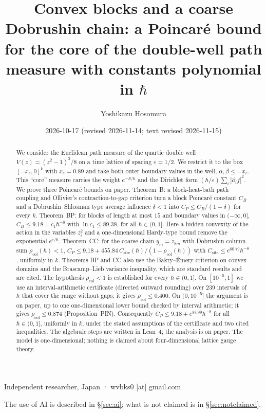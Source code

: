\documentclass[11pt,a4paper]{article}
\title{Convex blocks and a coarse Dobrushin chain: a Poincar\'e bound for the core of the double-well path measure with constants polynomial in $\hbar$}
\author{Yoshikazu Hosomura}
\date{2026-10-17 (revised 2026-11-14; text revised 2026-11-15)}
\theoremstyle{definition}
\theoremstyle{remark}
\newcommand{\xc}{x_c}
\newcommand{\rcol}{\rho_{\mathrm{col}}}
\newcommand{\Csite}{C_{\mathrm{site}}}
\begin{document}
\maketitle
\begin{center}\small Independent researcher, Japan · wvbks0 [at] gmail.com\end{center}
\begin{center}\small The use of AI is described in \S\ref{sec:ai}; what is not claimed is in \S\ref{sec:notclaimed}.\end{center}

\begin{abstract}
We consider the Euclidean path measure of the quartic double well $V(z)=(z^2-1)^2/8$ on a time lattice of spacing $\varepsilon=1/2$. We restrict it to the box $[-\xc,0]^k$ with $\xc=0.89$ and take both outer boundary values in the well, $\alpha,\beta\le-\xc$. This ``core'' measure carries the weight $e^{-S/\hbar}$ and the Dirichlet form $(\hbar/\varepsilon)\sum_i|\partial_if|^2$. We prove three Poincar\'e bounds on paper. Theorem~B: a block-heat-bath path coupling and Ollivier's contraction-to-gap criterion turn a block Poincar\'e constant $C_B$ and a Dobrushin--Shlosman type average influence $\delta<1$ into $C_P\le C_B/(1-\delta)$ for every $k$. Theorem~BP: for blocks of length at most $15$ and boundary values in $(-\infty,0]$, $C_B\le 9.18+c_1\hbar^{-8}$ with $\ln c_1\le 89.38$, for all $\hbar\in(0,1]$. Here a hidden convexity of the action in the variables $z_i^2$ and a one-dimensional Hardy-type bound remove the exponential $e^{c/\hbar}$. Theorem~CC: for the coarse chain $y_m=z_{8m}$ with Dobrushin column sum $\rcol(\hbar)<1$, $C_P\le 9.18+455.84\,\Csite(\hbar)/(1-\rcol(\hbar))$ with $\Csite\le e^{80.79}\hbar^{-8}$, uniformly in $k$. Theorems BP and CC also use the Bakry--\'Emery criterion on convex domains and the Brascamp--Lieb variance inequality, which are standard results and are cited. The hypothesis $\rcol<1$ is established for every $\hbar\in(0,1]$. On $[10^{-5},1]$ we use an interval-arithmetic certificate (directed outward rounding) over $239$ intervals of $\hbar$ that cover the range without gaps; it gives $\rcol\le0.400$. On $(0,10^{-5}]$ the argument is on paper, up to one one-dimensional lower bound checked by interval arithmetic; it gives $\rcol\le0.874$ (Proposition~PIN). Consequently $C_P\le9.18+e^{88.99}\hbar^{-8}$ for all $\hbar\in(0,1]$, uniformly in $k$, under the stated assumptions of the certificate and two cited inequalities. The algebraic steps are written in Lean~4; the analysis is on paper. The model is one-dimensional; nothing is claimed about four-dimensional lattice gauge theory.
\end{abstract}
\end{document}

